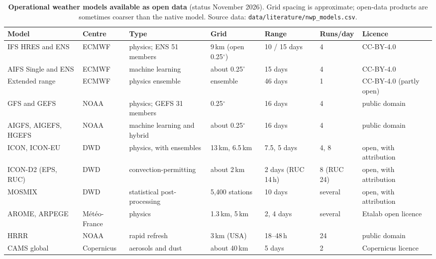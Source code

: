 \begin{table}[t]
\centering\small
\caption{\textbf{Operational weather models available as open data} (status November 2026). Grid spacing is approximate; open-data products are sometimes coarser than the native model. Source data: \texttt{data/literature/nwp\_models.csv}.}
\label{tab:models}
\setlength{\tabcolsep}{4pt}
\begin{tabularx}{\textwidth}{@{}L{3.2cm}L{1.9cm}L{2.7cm}L{2.0cm}L{1.6cm}L{1.5cm}Y@{}}
\toprule
Model & Centre & Type & Grid & Range & Runs/day & Licence \\
\midrule
IFS HRES and ENS & ECMWF & physics; ENS 51 members & 9\,km (open 0.25$^\circ$) & 10 / 15 days & 4 & CC-BY-4.0 \\
AIFS Single and ENS & ECMWF & machine learning & about 0.25$^\circ$ & 15 days & 4 & CC-BY-4.0 \\
Extended range & ECMWF & physics ensemble & ensemble & 46 days & 1 & CC-BY-4.0 (partly open) \\
GFS and GEFS & NOAA & physics; GEFS 31 members & 0.25$^\circ$ & 16 days & 4 & public domain \\
AIGFS, AIGEFS, HGEFS & NOAA & machine learning and hybrid & about 0.25$^\circ$ & 16 days & 4 & public domain \\
ICON, ICON-EU & DWD & physics, with ensembles & 13\,km, 6.5\,km & 7.5, 5 days & 4, 8 & open, with attribution \\
ICON-D2 (EPS, RUC) & DWD & convection-permitting & about 2\,km & 2 days (RUC 14\,h) & 8 (RUC 24) & open, with attribution \\
MOSMIX & DWD & statistical post-processing & 5,400 stations & 10 days & several & open, with attribution \\
AROME, ARPEGE & M\'et\'eo-France & physics & 1.3\,km, 5\,km & 2, 4 days & several & Etalab open licence \\
HRRR & NOAA & rapid refresh & 3\,km (USA) & 18--48\,h & 24 & public domain \\
CAMS global & Copernicus & aerosols and dust & about 40\,km & 5 days & 2 & Copernicus licence \\
\bottomrule
\end{tabularx}
\end{table}
